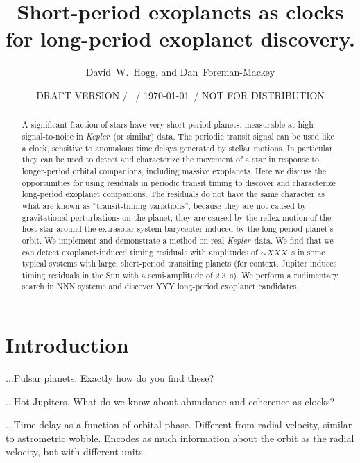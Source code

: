 \documentclass[12pt, preprint]{aastex}
\newcounter{affil}
\newcommand{\project}[1]{\textsl{#1}}
\newcommand{\Kepler}{\project{Kepler}}
\begin{document}
\title{
  Short-period exoplanets as clocks for long-period exoplanet discovery.
}
\author{
  David~W.~Hogg\altaffilmark{\ref{ccpp},\ref{cds},\ref{mpia},\ref{email}},
  and
  Dan~Foreman-Mackey\altaffilmark{\ref{ccpp}}
}
\date{DRAFT VERSION / \texttt{\githash}\ / \today\ / NOT FOR DISTRIBUTION}
\label{ccpp}
\label{cds}
\label{mpia}
\label{email}

\begin{abstract}
A significant fraction of stars have very short-period planets,
measurable at high signal-to-noise in \Kepler\ (or similar) data.
The periodic transit signal can be used like a clock, sensitive to
anomalous time delays generated by stellar motions.
In particular, they can be used to detect and characterize the
movement of a star in response to longer-period orbital companions,
including massive exoplanets.
Here we discuss the opportunities for using residuals in periodic
transit timing to discover and characterize long-period exoplanet
companions.
The residuals do not have the same character as what are known as
``transit-timing variations'', because they are not caused by
gravitational perturbations on the planet; they are caused by the
reflex motion of the host star around the extrasolar system barycenter
induced by the long-period planet's orbit.
We implement and demonstrate a method on real \Kepler\ data.  We find
that we can detect exoplanet-induced timing residuals with amplitudes
of $\sim XXX$~s in some typical systems with large, short-period
transiting planets (for context, Jupiter induces timing residuals in
the Sun with a semi-amplitude of 2.3~s).
We perform a rudimentary search in NNN systems and discover YYY
long-period exoplanet candidates.
\end{abstract}

\section{Introduction}

...Pulsar planets.  Exactly how do you find these?

...Hot Jupiters.  What do we know about abundance and coherence as
clocks?

...Time delay as a function of orbital phase.  Different from radial
velocity, similar to astrometric wobble.  Encodes as much information
about the orbit as the radial velocity, but with different units.
\end{document}
